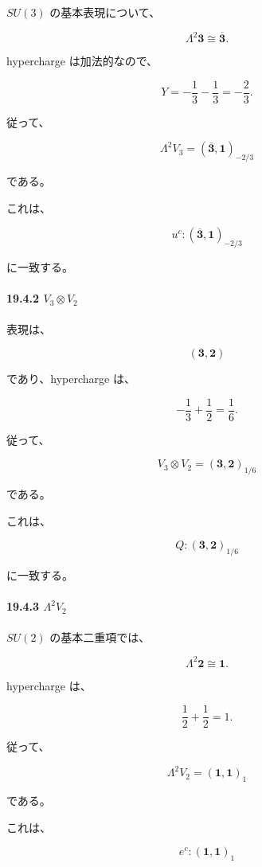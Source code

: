\documentclass[
  a4paper,
]{ltjsarticle}
\begin{document}
\(SU(3)\) の基本表現について、

\[
\Lambda^2\mathbf3
\cong
\overline{\mathbf3}.
\]

hypercharge は加法的なので、

\[
Y
=
-\frac13-\frac13
=
-\frac23.
\]

従って、

\[
\boxed{
\Lambda^2V_3
=
(\overline{\mathbf3},\mathbf1)_{-2/3}
}
\tag{115}
\]

である。

これは、

\[
\boxed{
u^c
:
(\overline{\mathbf3},\mathbf1)_{-2/3}
}
\tag{116}
\]

に一致する。

\paragraph{\texorpdfstring{19.4.2
\(V_3\otimes V_2\)}{19.4.2 V\_3\textbackslash otimes V\_2}}\label{v_3otimes-v_2}

表現は、

\[
(\mathbf3,\mathbf2)
\]

であり、hypercharge は、

\[
-\frac13+\frac12
=
\frac16.
\]

従って、

\[
\boxed{
V_3\otimes V_2
=
(\mathbf3,\mathbf2)_{1/6}
}
\tag{117}
\]

である。

これは、

\[
\boxed{
Q
:
(\mathbf3,\mathbf2)_{1/6}
}
\tag{118}
\]

に一致する。

\paragraph{\texorpdfstring{19.4.3
\(\Lambda^2V_2\)}{19.4.3 \textbackslash Lambda\^{}2V\_2}}\label{lambda2v_2}

\(SU(2)\) の基本二重項では、

\[
\Lambda^2\mathbf2
\cong
\mathbf1.
\]

hypercharge は、

\[
\frac12+\frac12=1.
\]

従って、

\[
\boxed{
\Lambda^2V_2
=
(\mathbf1,\mathbf1)_1
}
\tag{119}
\]

である。

これは、

\[
\boxed{
e^c
:
(\mathbf1,\mathbf1)_1
}
\tag{120}
\]
\end{document}
